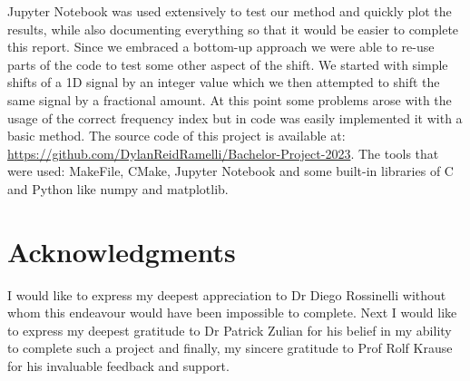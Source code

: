 \documentclass[]{usiinfbachelorproject}
\begin{document}
		Jupyter Notebook was used extensively to test our method and quickly plot the results, while also documenting everything so that it would be easier to complete this report. Since we embraced a bottom-up approach we were able to re-use parts of the code to test some other aspect of the shift. We started with simple shifts of a 1D signal by an integer value which we then attempted to shift the same signal by a fractional amount. At this point some problems arose with the usage of the correct frequency index but in code was easily implemented it with a basic method. The source code of this project is available at: \url{https://github.com/DylanReidRamelli/Bachelor-Project-2023}.
		The tools that were used: MakeFile, CMake, Jupyter Notebook and some built-in libraries of C and Python like numpy and matplotlib.
		\section* {Acknowledgments}
		
		I would like to express my deepest appreciation to Dr Diego Rossinelli without whom this endeavour would have been impossible to complete. Next I would like to express my deepest gratitude to Dr Patrick Zulian for his belief in my ability to complete such a project and finally, my sincere gratitude to Prof Rolf Krause for his invaluable feedback and support.
		
		
	
\end{document}
